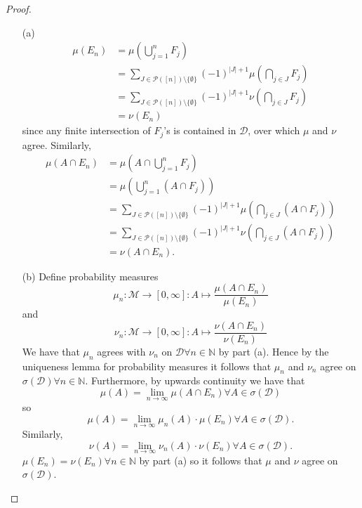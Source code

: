 \documentclass{article}
\begin{document}
\begin{proof}
\begin{enumerate}
    \item[(a)] \begin{align*}\mu(E_n)&=\mu(\bigcup_{j=1}^n F_j)\\&=\sum_{J\in\mathcal{P}([n])\setminus\{\emptyset\}}(-1)^{|J|+1}\mu(\bigcap_{j\in J}F_j)\\&=\sum_{J\in\mathcal{P}([n])\setminus\{\emptyset\}}(-1)^{|J|+1}\nu(\bigcap_{j\in J}F_j)\\&=\nu(E_n)\end{align*} since any finite intersection of $F_j$'s is contained in $\mathcal{D}$, over which $\mu$ and $\nu$ agree.
    Similarly, \begin{align*}\mu(A\cap E_n)&=\mu(A\cap \bigcup_{j=1}^n F_j)\\&=\mu(\bigcup_{j=1}^n (A\cap F_j))\\&=\sum_{J\in\mathcal{P}([n])\setminus\{\emptyset\}}(-1)^{|J|+1}\mu(\bigcap_{j\in J}(A\cap F_j))\\&=\sum_{J\in\mathcal{P}([n])\setminus\{\emptyset\}}(-1)^{|J|+1}\nu(\bigcap_{j\in J}(A\cap F_j))\\&=\nu(A\cap E_n).\end{align*}
    \item[(b)] Define probability measures \[\mu_n:\mathcal{M}\to[0,\infty]:A\mapsto\frac{\mu(A\cap E_n)}{\mu(E_n)}\]and\[\nu_n:\mathcal{M}\to[0,\infty]:A\mapsto\frac{\nu(A\cap E_n)}{\nu(E_n)}\] We have that $\mu_n$ agrees with $\nu_n$ on $\mathcal{D}\forall n\in\mathbb{N}$ by part (a). Hence by the uniqueness lemma for probability measures it follows that $\mu_n$ and $\nu_n$ agree on $\sigma(\mathcal{D})\forall n\in\mathbb{N}$. Furthermore, by upwards continuity we have that \[\mu(A)=\lim_{n\to\infty}\mu(A\cap E_n)\forall A\in\sigma(\mathcal{D})\]so \[\mu(A)=\lim_{n\to\infty}\mu_n(A)\cdot\mu(E_n)\forall A\in\sigma(\mathcal{D}).\] Similarly,\[\nu(A)=\lim_{n\to\infty}\nu_n(A)\cdot\nu(E_n)\forall A\in\sigma(\mathcal{D}).\] $\mu(E_n)=\nu(E_n)\forall n\in\mathbb{N}$ by part (a) so it follows that $\mu$ and $\nu$ agree on $\sigma(\mathcal{D})$.
\end{enumerate}
\end{proof}
\end{document}
